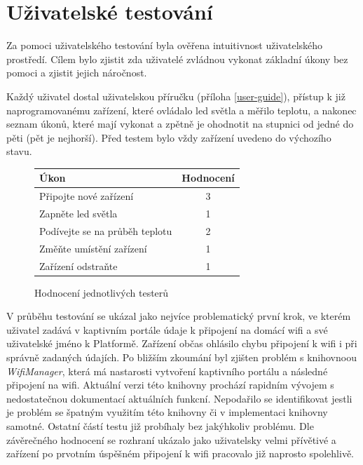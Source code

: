 

\section{Uživatelské testování}
Za pomoci uživatelského testování byla ověřena intuitivnost uživatelského prostředí. Cílem bylo zjistit zda uživatelé zvládnou vykonat základní úkony bez pomoci a zjistit jejich náročnost.

Každý uživatel dostal uživatelskou příručku (příloha \ref{user-guide}), přístup k již naprogramovanému zařízení, které ovládalo led světla a měřilo teplotu, a nakonec seznam úkonů, které mají vykonat a zpětně je ohodnotit na stupnici od jedné do pěti (pět je nejhorší). Před testem bylo vždy zařízení uvedeno do výchozího stavu.


\begin{figure}
    \centering
    \begin{tabular}{ | l | c | }
        \hline
        Úkon                           & Hodnocení \\
        \hline
        Připojte nové zařízení         & 3         \\
        \hline
        Zapněte led světla             & 1         \\
        \hline
        Podívejte se na průběh teplotu & 2         \\
        \hline
        Změňte umístění zařízení       & 1         \\
        \hline
        Zařízení odstraňte             & 1         \\
        \hline
    \end{tabular}
    \caption{Hodnocení jednotlivých testerů}
\end{figure}

V průběhu testování se ukázal jako nejvíce problematický první krok, ve kterém uživatel zadává v kaptivním portále údaje k připojení na domácí wifi a své uživatelské jméno k Platformě. Zařízení občas ohlásilo chybu připojení k wifi i při správně zadaných údajích. Po bližším zkoumání byl zjišten problém s knihovnoou \textit{WifiManager}, která má nastarosti vytvoření kaptivního portálu a následné připojení na wifi. Aktuální verzi této knihovny prochází rapidním vývojem s nedostatečnou dokumentací aktuálních funkcní. Nepodařilo se identifikovat jestli je problém se špatným využitím této knihovny či v implementaci knihovny samotné. Ostatní částí testu již probíhaly bez jakýhkoliv problému. Dle závěrečného hodnocení se rozhraní ukázalo jako uživatelsky velmi přívětivé a zařízení po prvotním úspěšném připojení k wifi pracovalo již naprosto spolehlivě.